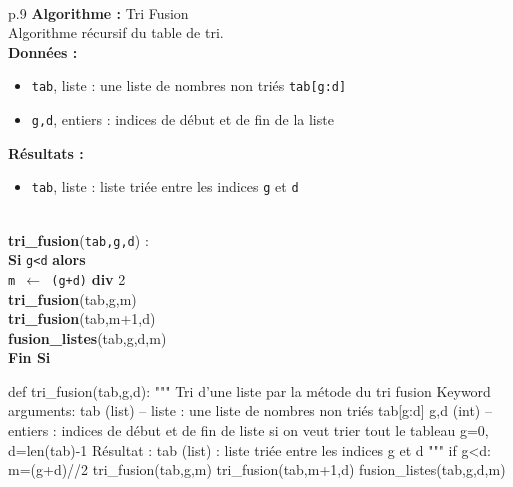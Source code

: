 \documentclass[10pt,fleqn]{article} %
\newcommand{\tsf}[1]{\small{\texttt{#1}}}
\begin{document}
\begin{minipage}[c]{.48\linewidth}
\begin{pseudo}
~\\
\begin{tabular}{p{.9\textwidth}}
\hline
\textbf{Algorithme :} Tri Fusion \\
\hline
Algorithme récursif du table de tri. \\
\textbf{Données :}
\begin{itemize}
\item \tsf{tab}, liste : une liste de nombres non triés \tsf{tab[g:d]} 
\item \tsf{g,d}, entiers : indices de début et de fin de la liste
\end{itemize}
\textbf{Résultats :} 
\begin{itemize}
\item \tsf{tab}, liste : liste triée entre les indices \tsf{g} et \tsf{d}
\end{itemize}
\\
\textbf{tri\_fusion}(\tsf{tab,g,d}) :\\
\hspace{.4cm} \textbf{Si} \tsf{g<d}  \textbf{alors} \\
\hspace{.8cm} \tsf{m $\leftarrow$ (g+d)} \textbf{div} 2\\
\hspace{.8cm} \textbf{tri\_fusion}(tab,g,m) \\
\hspace{.8cm} \textbf{tri\_fusion}(tab,m+1,d) \\
\hspace{.8cm} \textbf{fusion\_listes}(tab,g,d,m) \\
\hspace{.4cm}  \textbf{Fin Si}\\
\hline
\end{tabular}
\end{pseudo}
\end{minipage}\hfill
\begin{minipage}[c]{.48\linewidth}
\begin{py}
\begin{python}        
def tri_fusion(tab,g,d):
    """
    Tri d'une liste par la métode du tri fusion
    Keyword arguments:
    tab (list) -- liste : une liste de nombres non 
      triés tab[g:d]
    g,d (int) -- entiers : indices de début et 
      de fin de liste si on veut trier
      tout le tableau g=0, d=len(tab)-1
    Résultat :
    tab (list) : liste triée entre les indices 
      g et d
    """
    if g<d:
        m=(g+d)//2
        tri_fusion(tab,g,m)
        tri_fusion(tab,m+1,d)
        fusion_listes(tab,g,d,m)
\end{python}
\end{py}
\end{minipage}
\end{document}
